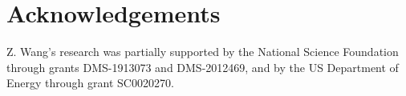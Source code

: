 \documentclass[11pt]{article}
\newenvironment{proof}[1][Proof]{\begin{trivlist}
\item[\hskip \labelsep {\bfseries #1}]}{\end{trivlist}}
\begin{document}


\section{Acknowledgements}
Z. Wang's research was partially supported by the National Science Foundation through grants DMS-1913073 and DMS-2012469, and by the US Department of Energy through grant SC0020270. 


\end{document}
